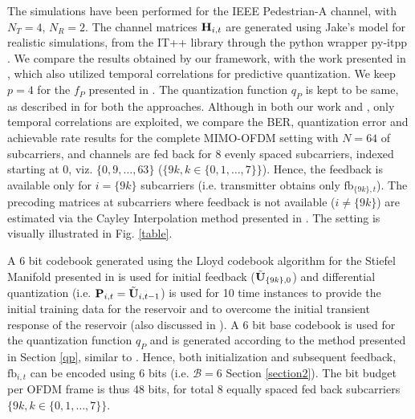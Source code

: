 \documentclass[conference]{IEEEtran}
\begin{document}
\noindent The simulations have been performed for the IEEE Pedestrian-A channel, with $N_T=4$, $N_R=2$.  The channel matrices ${\bf H}_{i,t}$ are generated using Jake's model for realistic simulations, from the IT++ library through the python wrapper py-itpp \cite{ViditPy}. 
We compare the results obtained by our framework, with the work presented in \cite{6891198}, which also utilized temporal correlations for predictive quantization.
We keep $p=4$ for the $f_P$ presented in \cite{6891198}.
The quantization function $q_P$ is kept to be same, as described in \cite{6545375,6891198,Gupt1905:Predictive} for both the approaches.
Although in both our work and \cite{6891198}, only temporal correlations are exploited, we compare the BER, quantization error and achievable rate results for the complete MIMO-OFDM setting with $N=64$ of subcarriers, and channels are fed back for $8$ evenly spaced subcarriers, indexed starting at 0, viz. $\{0,9,\ldots,63\}$ ($\{9k, k \in \{0,1,\ldots,7\}\}$). Hence, the feedback is available only for $i=\{9k\}$ subcarriers (i.e. transmitter obtains only $\text{fb}_{\{9k\},t}$).
The precoding matrices at subcarriers where feedback is not available ($i\neq\{9k\}$) are estimated via the Cayley Interpolation method presented in \cite{Gupt1905:Predictive}.
The setting is visually illustrated in Fig. \ref{table}.

A 6 bit codebook generated using the Lloyd codebook algorithm for the Stiefel Manifold presented in \cite{6678348} is used for initial feedback ($\tilde{{\bf U}}_{\{9k\},0}$) and differential quantization (i.e. ${\bf P}_{i,t}=\tilde{{\bf U}}_{i,t-1}$) is used for 10 time instances to provide the initial training data for the reservoir and to overcome the initial transient response of the reservoir (also discussed in \cite{mosleh2017brain}).
A 6 bit base codebook is used for the quantization function $q_P$ and is generated according to the method presented in Section \ref{qp}, similar to \cite{Gupt1905:Predictive}.
Hence, both initialization and subsequent feedback, $\text{fb}_{i,t}$ can be encoded using 6 bits (i.e. $\mathcal{B}=6$ Section \ref{section2}).
The bit budget per OFDM frame is thus 48 bits, for total 8 equally spaced fed back subcarriers $\{9k, k \in \{0,1,\ldots,7\}\}$.
\end{document}
